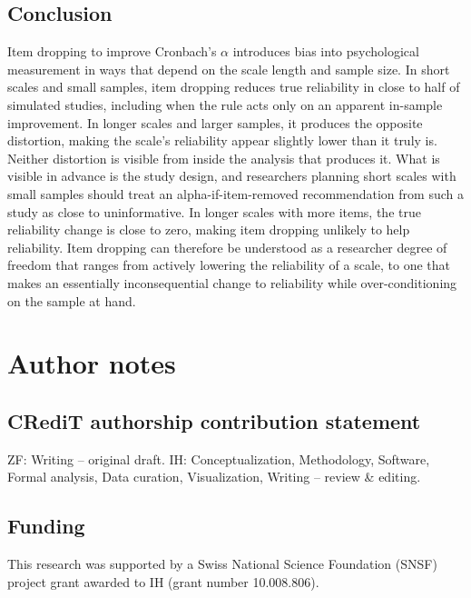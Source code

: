 \documentclass[
  nonatbib,
  authoryear,
  preprint]{elsarticle}
\begin{document}
\subsection{Conclusion}\label{conclusion}

Item dropping to improve Cronbach's \(\alpha\) introduces bias into
psychological measurement in ways that depend on the scale length and
sample size. In short scales and small samples, item dropping reduces
true reliability in close to half of simulated studies, including when
the rule acts only on an apparent in-sample improvement. In longer
scales and larger samples, it produces the opposite distortion, making
the scale's reliability appear slightly lower than it truly is. Neither
distortion is visible from inside the analysis that produces it. What is
visible in advance is the study design, and researchers planning short
scales with small samples should treat an alpha-if-item-removed
recommendation from such a study as close to uninformative. In longer
scales with more items, the true reliability change is close to zero,
making item dropping unlikely to help reliability. Item dropping can
therefore be understood as a researcher degree of freedom that ranges
from actively lowering the reliability of a scale, to one that makes an
essentially inconsequential change to reliability while
over-conditioning on the sample at hand.

\section*{Author notes}\label{author-notes}

\subsection*{CRediT authorship contribution
statement}\label{credit-authorship-contribution-statement}

ZF: Writing -- original draft. IH: Conceptualization, Methodology,
Software, Formal analysis, Data curation, Visualization, Writing --
review \& editing.

\subsection*{Funding}\label{funding}

This research was supported by a Swiss National Science Foundation
(SNSF) project grant awarded to IH (grant number 10.008.806).
\end{document}
